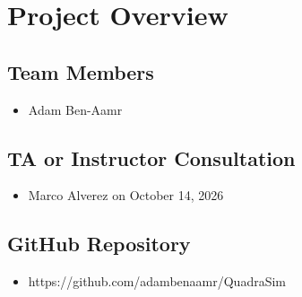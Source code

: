 \section*{Project Overview}

\subsection*{Team Members}

\begin{itemize}
  \item Adam Ben-Aamr
\end{itemize}

\subsection*{TA or Instructor Consultation}

\begin{itemize}
  \item Marco Alverez on October 14, 2026
\end{itemize}

\subsection*{GitHub Repository}

\begin{itemize}
  \item https://github.com/adambenaamr/QuadraSim
\end{itemize}
